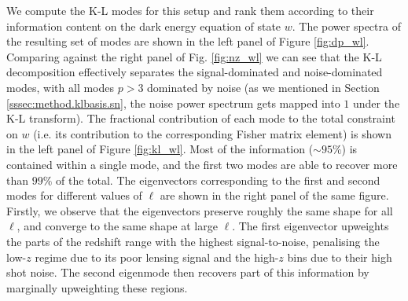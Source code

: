 \documentclass[twocolumn,amsfont,amssymb,amsmath, showpacs,balancelastpage, nofootinbib]{revtex4-1}
\begin{document}
    We compute the K-L modes for this setup and rank them according to their information content on the dark energy equation of state $w$. The power spectra of the resulting set of modes are shown in the left panel of Figure \ref{fig:dp_wl}. Comparing against the right panel of Fig. \ref{fig:nz_wl} we can see that the K-L decomposition effectively separates the signal-dominated and noise-dominated modes, with all modes $p>3$ dominated by noise (as we mentioned in Section \ref{sssec:method.klbasis.sn}, the noise power spectrum gets mapped into $1$ under the K-L transform). The fractional contribution of each mode to the total constraint on $w$ (i.e. its contribution to the corresponding Fisher matrix element) is shown in the left panel of Figure \ref{fig:kl_wl}. Most of the information ($\sim95\%$) is contained within a single mode, and the first two modes are able to recover more than $99\%$ of the total. The eigenvectors corresponding to the first and second modes for different values of $\ell$ are shown in the right panel of the same figure. Firstly, we observe that the eigenvectors preserve roughly the same shape for all $\ell$, and converge to the same shape at large $\ell$. The first eigenvector upweights the parts of the redshift range with the highest signal-to-noise, penalising the low-$z$ regime due to its poor lensing signal and the high-$z$ bins due to their high shot noise. The second eigenmode then recovers part of this information by marginally upweighting these regions.
\end{document}
